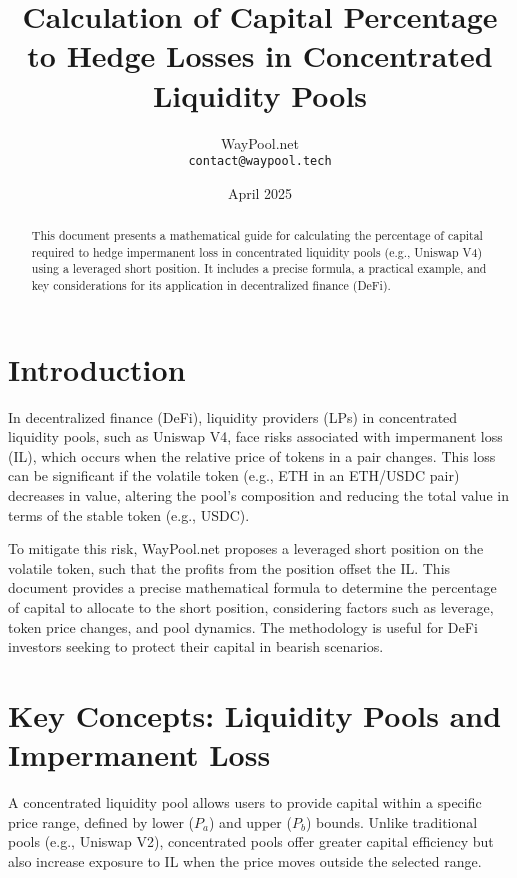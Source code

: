 \documentclass[11pt]{article}
\title{Calculation of Capital Percentage to Hedge Losses in Concentrated Liquidity Pools}
\author{WayPool.net \\ \texttt{contact@waypool.tech}}
\date{April 2025}
\begin{document}
\maketitle

\begin{abstract}
This document presents a mathematical guide for calculating the percentage of capital required to hedge impermanent loss in concentrated liquidity pools (e.g., Uniswap V4) using a leveraged short position. It includes a precise formula, a practical example, and key considerations for its application in decentralized finance (DeFi).
\end{abstract}

\tableofcontents

\section{Introduction}
In decentralized finance (DeFi), liquidity providers (LPs) in concentrated liquidity pools, such as Uniswap V4, face risks associated with impermanent loss (IL), which occurs when the relative price of tokens in a pair changes. This loss can be significant if the volatile token (e.g., ETH in an ETH/USDC pair) decreases in value, altering the pool's composition and reducing the total value in terms of the stable token (e.g., USDC).

To mitigate this risk, WayPool.net proposes a leveraged short position on the volatile token, such that the profits from the position offset the IL. This document provides a precise mathematical formula to determine the percentage of capital to allocate to the short position, considering factors such as leverage, token price changes, and pool dynamics. The methodology is useful for DeFi investors seeking to protect their capital in bearish scenarios.

\section{Key Concepts: Liquidity Pools and Impermanent Loss}
A concentrated liquidity pool allows users to provide capital within a specific price range, defined by lower (\(P_a\)) and upper (\(P_b\)) bounds. Unlike traditional pools (e.g., Uniswap V2), concentrated pools offer greater capital efficiency but also increase exposure to IL when the price moves outside the selected range.
\end{document}
